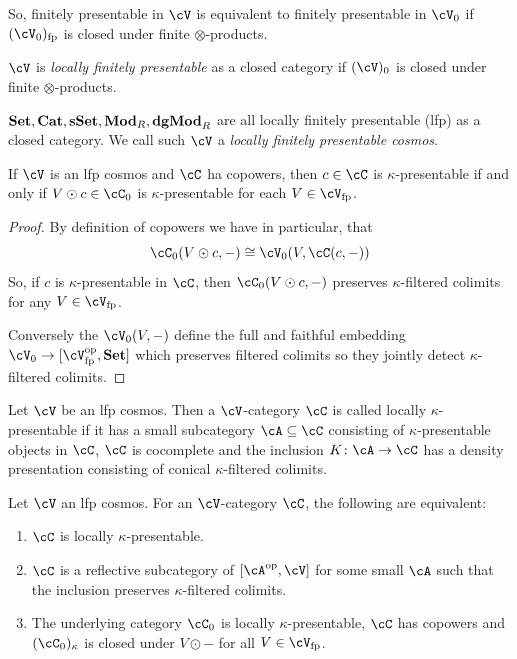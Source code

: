 \documentclass[a4paper,11pt,oneside,openany]{scrbook}
\begin{document}
So, finitely presentable in $ \cV $ is equivalent to finitely presentable in $ \cV_0 $ if $ (\cV_0)_{\text{fp}} $ is closed under finite $ \otimes $-products.

\begin{defn}
	$ \cV $ is \emph{locally finitely presentable} as a closed category if $ (\cV)_0 $ is closed under finite $ \otimes $-products.
\end{defn}

\begin{exmp}
	$ {\normalfont\textbf{Set}},{\normalfont\textbf{Cat}},{\normalfont\textbf{sSet}},{\normalfont\textbf{Mod}}_R,{\normalfont\textbf{dgMod}}_R $ are all locally finitely presentable
    (lfp) as a closed category. We call such $ \cV $ a \emph{locally finitely
    presentable cosmos}.
\end{exmp}
\begin{prop}
	If $ \cV $ is an lfp cosmos and $ \cC $ ha copowers, then $ c\in \cC $ is $ \kappa $-presentable if and only if $ V\odot c \in \cC_0 $ is $ \kappa $-presentable for each $ V \in \cV_{\text{fp}} $.
\end{prop}
\begin{proof}
	By definition of copowers we have in particular, that
	\begin{displaymath}
		\cC_0(V \odot c , -) \iso \cV_0 (V , \cC(c,-))
	\end{displaymath}
	So, if $ c $ is $ \kappa $-presentable in $ \cC $, then $ \cC_0(V\odot c, -) $ preserves $ \kappa $-filtered colimits for any $ V \in \cV_{\text{fp}} $.

	Conversely the $ \cV_0(V,-) $ define the full and faithful embedding $ \cV_0 \to [\cV ^{\op} _{\text{fp}} , \Set ] $ which preserves filtered colimits so they jointly detect $ \kappa $-filtered colimits.
\end{proof}
\begin{defn}
	Let $ \cV $ be an lfp  cosmos. Then a $ \cV $-category $ \cC $ is called
    locally $ \kappa $-presentable if it has a small subcategory $ \cA
    \subseteq\cC  $ consisting of $ \kappa $-presentable objects in $ \cC $, $
    \cC $ is cocomplete and the inclusion $ K \from \cA\rightarrow\cC  $ has a
    density presentation consisting of conical $ \kappa $-filtered colimits.
\end{defn}
\begin{thm}
	Let $ \cV $ an lfp cosmos.
	For an $ \cV $-category $ \cC $, the following are equivalent:
	\begin{enumerate}[label=\arabic*)]
		\item
		      $ \cC $ is locally $ \kappa $-presentable.
		\item
		      $ \cC $ is a reflective subcategory of $ [\cA^{\op}, \cV] $ for some small $ \cA $ such that the inclusion preserves $ \kappa $-filtered colimits.\item
		      The underlying category $ \cC_0 $ is locally $ \kappa $-presentable, $ \cC  $ has copowers and $ (\cC_0)_{\kappa}  $ is closed under $ V\odot - $ for all $ V \in \cV_{\text{fp}} $.
	\end{enumerate}
\end{thm}
\end{document}
